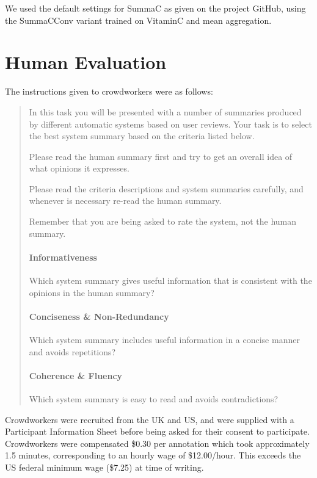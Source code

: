 \documentclass[11pt]{article}
\begin{document}
We used the default settings for SummaC \cite{laban-etal-2022-summac} as given on the project GitHub, using the SummaCConv variant trained on VitaminC \cite{schuster-etal-2021-get} and mean aggregation.

\section{Human Evaluation}
\label{app:humaneval}

The instructions given to crowdworkers were as follows:

\begin{quote}
    
In this task you will be presented with a number of summaries produced by different automatic systems based on user reviews. Your task is to select the best system summary based on the criteria listed below.

Please read the human summary first and try to get an overall idea of what opinions it expresses.

Please read the criteria descriptions and system summaries carefully, and whenever is necessary re-read the human summary.

Remember that you are being asked to rate the system, not the human summary.

\paragraph{Informativeness} Which system summary gives useful information that is consistent with the opinions in the human summary?

\paragraph{Conciseness \& Non-Redundancy}
Which system summary includes useful information in a concise manner and avoids repetitions?

\paragraph{Coherence \& Fluency}
Which system summary is easy to read and avoids contradictions?
\end{quote}

Crowdworkers were recruited from the UK and US, and were supplied with a Participant Information Sheet before being asked for their consent to participate. Crowdworkers were compensated \$0.30 per annotation which took approximately 1.5 minutes, corresponding to an hourly wage of \$12.00/hour. This exceeds the US federal minimum wage (\$7.25) at time of writing.
\end{document}
